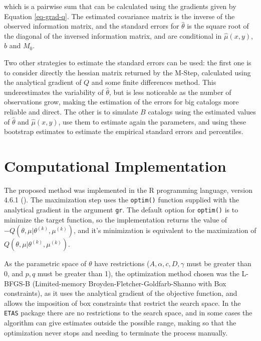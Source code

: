 \noindent which is a pairwise sum that can be calculated using the gradients given by Equation \eqref{eq-grad-q}. The estimated covariance matrix is the inverse of the observed information matrix, and the standard errors for $\hat{\theta}$ is the square root of the diagonal of the inversed information matrix, and are conditional in $\hat{\mu}(x,y)$, $\hat{b}$ and $M_{0}$.

Two other strategies to estimate the standard errors can be used: the first one is to consider directly the hessian matrix returned by the M-Step, calculated using the analytical gradient of $Q$ and some finite differences method. This underestimates the variability of $\hat{\theta}$, but is less noticeable as the number of observations grow, making the estimation of the errors for big catalogs more reliable and direct. The other is to simulate $B$ catalogs using the estimated values of $\hat{\theta}$ and $\hat{\mu}(x,y)$, use them to estimate again the parameters, and using these bootstrap estimates to estimate the empirical standard errors and percentiles.

\section{Computational Implementation}
\label{sec-comput-impl}

The proposed method was implemented in the R programming language, version 4.6.1 (). The maximization step uses the \texttt{optim()} function supplied with the analytical gradient in the argument \texttt{gr}. The default option for \texttt{optim()} is to minimize the target function, so the implementation returns the value of $-Q(\theta,\mu|\theta^{(k)},\mu^{(k)})$, and it's minimization is equivalent to the maximization of $Q(\theta, \mu|\theta^{(k)}, \mu^{(k)})$.

As the parametric space of $\theta$ have restrictions ($A, \alpha, c, D, \gamma$ must be greater than 0, and $p, q$ must be greater than 1), the optimization method chosen was the L-BFGS-B (Limited-memory Broyden-Fletcher-Goldfarb-Shanno with Box constraints), as it uses the analytical gradient of the objective function, and allows the imposition of box constraints that restrict the search space. In the \texttt{ETAS} package there are no restrictions to the search space, and in some cases the algorithm can give estimates outside the possible range, making so that the optimization never stops and needing to terminate the process manually.

